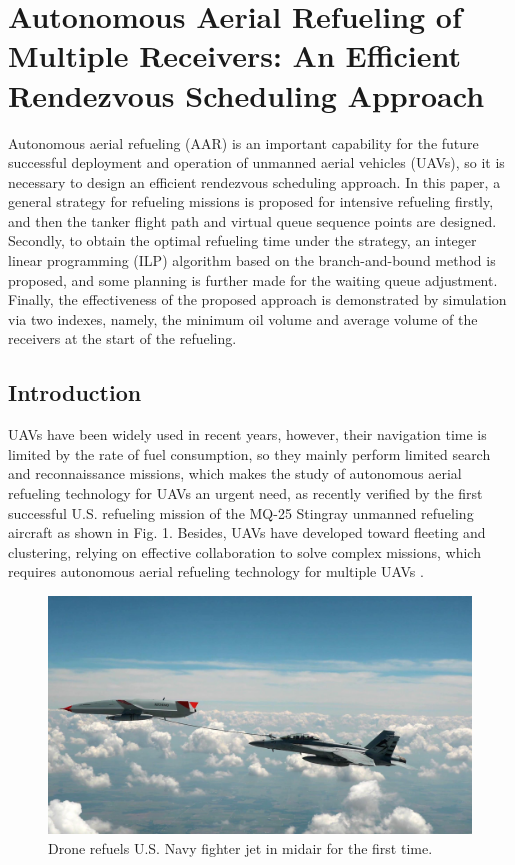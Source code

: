 
\chapter{Autonomous Aerial Refueling of Multiple Receivers: An Efficient Rendezvous Scheduling Approach}

Autonomous aerial refueling (AAR) is an important capability for the future successful deployment and operation of unmanned aerial vehicles (UAVs), so it is necessary to design an efficient rendezvous scheduling approach. In this paper, a general strategy for refueling missions is proposed for intensive refueling firstly, and then the tanker flight path and virtual queue sequence points are designed. Secondly, to obtain the optimal refueling time under the strategy, an integer linear programming (ILP) algorithm based on the branch-and-bound method is proposed, and some planning is further made for the waiting queue adjustment. Finally, the effectiveness of the proposed approach is demonstrated by simulation via two indexes, namely, the minimum oil volume and average volume of the receivers at the start of  the refueling.

\section{Introduction}
UAVs have been widely used in recent years, however, their navigation time is limited by the rate of fuel consumption, so they mainly perform limited search and reconnaissance missions, which makes the study of autonomous aerial refueling technology for UAVs an urgent need, as recently verified by the first successful U.S. refueling mission of the MQ-25 Stingray unmanned refueling aircraft as shown in Fig. 1. Besides, UAVs have developed toward fleeting and clustering, relying on effective collaboration to solve complex missions, which requires autonomous aerial refueling technology for multiple UAVs \cite{b1}.
\begin{figure}[htbp]
	\centerline{\includegraphics[width=.45\textwidth]{Figures/Figs_Ch15/05bc5d138937a5b023e613758ee9b368.jpg}}
	\caption{Drone refuels U.S. Navy fighter jet in midair for the first time.}
	\label{fig}
\end{figure}

